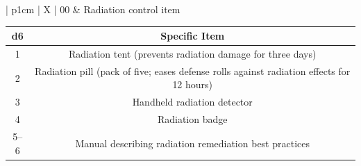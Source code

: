 \begin{xltabular}{\textwidth}{| p{1cm} | X |}
00 & Radiation control item 

  \parbox[t]{\linewidth}{ %
  \begin{tabular}{| c | c |} \hline
  
  \textbf{d6} & \textbf{Specific Item} \\ \hline 
 
 1 & Radiation tent (prevents radiation damage for three days)  \\ \hline
 2 & Radiation pill (pack of five; eases defense rolls against radiation effects for 12 hours) \\ \hline
 3 & Handheld radiation detector  \\ \hline
 4 & Radiation badge  \\ \hline
 5–6 & Manual describing radiation remediation best practices  \\ \hline
 
 \end{tabular}} \\ \hline

\end{xltabular} 
 
